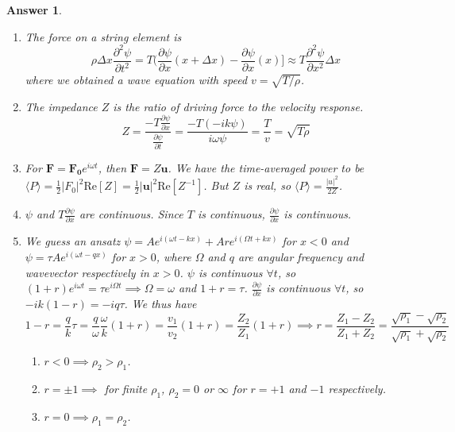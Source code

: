 \documentclass[a4paper]{article}
\newtheorem{ans}{Answer}[subsection]
\theoremstyle{new}
\begin{document}
\begin{ans}\leavevmode
\begin{enumerate}[label=(\alph*)]
\item The force on a string element is
$$\rho\Delta x\frac{\partial^2\psi}{\partial t^2}=T\bigg(\frac{\partial\psi}{\partial x}
(x+\Delta x)-\frac{\partial\psi}{\partial x}(x)\bigg]\approx T\frac{\partial^2\psi}{\partial x^2}\Delta x$$
where we obtained a wave equation with speed $v=\sqrt{T/\rho}$.
\item The impedance $Z$ is the ratio of driving force to the velocity response.
$$Z=\frac{-T\frac{\partial\psi}{\partial x}}{\frac{\partial\psi}{\partial t}}=\frac{-T(-ik\psi)}{i\omega\psi}=\frac{T}{v}=\sqrt{T\rho}$$
\item For $\mathbf{F}=\mathbf{F_0}e^{i\omega t}$, then $\mathbf{F}=Z\mathbf{u}$. We have the time-averaged power to be $\langle P\rangle=\frac{1}{2}|F_0|^2\text{Re}[Z]=\frac{1}{2}|\mathbf{u}|^2\text{Re}[Z^{-1}]$. But $Z$ is real, so $\langle P\rangle=\frac{|u|^2}{2Z}$.
\item $\psi$ and $T\frac{\partial\psi}{\partial x}$ are continuous. Since $T$ is continuous, $\frac{\partial\psi}{\partial x}$ is continuous.
\item We guess an ansatz $\psi=Ae^{i(\omega t-kx)}+Are^{i(\Omega t+kx)}$ for $x<0$ and $\psi=\tau Ae^{i(\omega t-qx)}$ for $x>0$, where $\Omega$ and $q$ are angular frequency and wavevector respectively in $x>0$. $\psi$ is continuous $\forall t$, so $(1+r)e^{i\omega t}=\tau e^{i\Omega t}\implies\Omega=\omega$ and $1+r=\tau$. $\frac{\partial\psi}{\partial x}$ is continuous $\forall t$, so $-ik(1-r)=-iq\tau$. We thus have 
$$1-r=\frac{q}{k}\tau=\frac{q}{\omega}\frac{\omega}{k}(1+r)=\frac{v_1}{v_2}(1+r)=\frac{Z_2}{Z_1}(1+r)\implies r=\frac{Z_1-Z_2}{Z_1+Z_2}=\frac{\sqrt{\rho_1}-\sqrt{\rho_2}}{\sqrt{\rho_1}+\sqrt{\rho_2}}$$
\begin{enumerate}[label=(\roman*)]
    \item $r<0\implies \rho_2>\rho_1$.
    \item $r=\pm 1\implies$ for finite $\rho_1$, $\rho_2=0$ or $\infty$ for $r=+1$ and $-1$ respectively.
    \item $r=0\implies\rho_1=\rho_2$.
\end{enumerate}
\end{enumerate}
\end{ans}
\newpage
\end{document}
